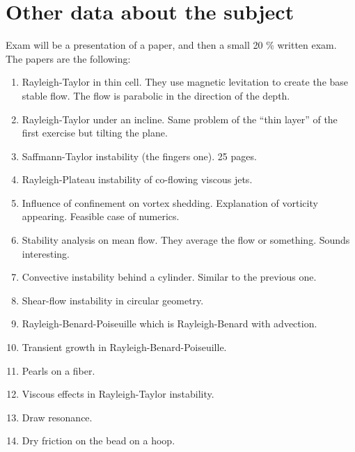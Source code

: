 \documentclass[palatino]{epflnotes}
\begin{document}
\chapter{Other data about the subject}

Exam will be a presentation of a paper, and then a small 20 \% written exam. The papers are the following:

\begin{enumerate}
	\item Rayleigh-Taylor in thin cell. They use magnetic levitation to create the base stable flow. The flow is parabolic in the direction of the depth.
	\item Rayleigh-Taylor under an incline. Same problem of the ``thin layer'' of the first exercise but tilting the plane.
	\item Saffmann-Taylor instability (the fingers one). 25 pages.
	\item Rayleigh-Plateau instability of co-flowing viscous jets.
	\item Influence of confinement on vortex shedding. Explanation of vorticity appearing. Feasible case of numerics.
	\item Stability analysis on mean flow. They average the flow or something. Sounds interesting.
	\item Convective instability behind a cylinder. Similar to the previous one.
	\item Shear-flow instability in circular geometry.
	\item Rayleigh-Benard-Poiseuille which is Rayleigh-Benard with advection.
	\item Transient growth in Rayleigh-Benard-Poiseuille.
	\item Pearls on a fiber.
	\item Viscous effects in Rayleigh-Taylor instability.
	\item Draw resonance.
	\item Dry friction on the bead on a hoop.
\end{enumerate}

\backmatter
\printindex


\end{document}
